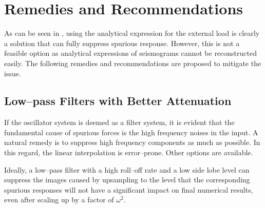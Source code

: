 %
\section{Remedies and Recommendations}
As can be seen in , using the analytical expression for the external load is clearly a solution that can fully suppress spurious response. However, this is not a feasible option as analytical expressions of seismograms cannot be reconstructed easily. The following remedies and recommendations are proposed to mitigate the issue.
\subsection{Low--pass Filters with Better Attenuation}
If the oscillator system is deemed as a filter system, it is evident that the fundamental cause of spurious forces is the high frequency noises in the input. A natural remedy is to suppress high frequency components as much as possible. In this regard, the linear interpolation is error--prone. Other options are available.

Ideally, a low--pass filter with a high roll--off rate and a low side lobe level can suppress the images caused by upsampling to the level that the corresponding spurious responses will not have a significant impact on final numerical results, even after scaling up by a factor of $\omega^2$.

